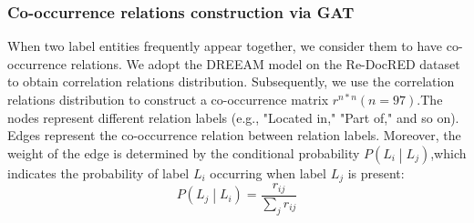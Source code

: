 \documentclass[preprint,12pt]{elsarticle}
\begin{document}
\subsubsection{Co-occurrence relations construction via GAT}\label{subsubsec2}

When two label entities frequently appear together, we consider them to have   co-occurrence relations. We adopt the DREEAM model \cite{ma-etal-2023-dreeam} on the Re-DocRED dataset to obtain  correlation relations distribution. Subsequently, we use the correlation relations distribution to construct a co-occurrence matrix $r^{n*n}(n =97)$.The nodes represent different relation labels (e.g., "Located in," "Part of," and so on). Edges represent the co-occurrence relation between relation labels. Moreover, the weight of the edge is determined by the conditional probability $P\left( L_{i} \middle| L_{j} \right)$,which indicates the probability of label $L_i$ occurring when label $L_j$ is present:
\begin{equation}
P\left( L_{j} \middle| L_{i} \right) = \frac{r_{ij}}{\sum\limits_{j}r_{ij}}\label{eq7}
\end{equation}
\end{document}
